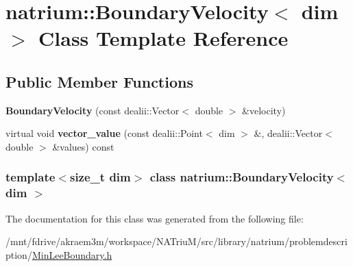 \hypertarget{classnatrium_1_1BoundaryVelocity}{
\section{natrium::BoundaryVelocity$<$ dim $>$ Class Template Reference}
\label{classnatrium_1_1BoundaryVelocity}
}
\subsection*{Public Member Functions}
\begin{DoxyCompactItemize}
\item 
\hypertarget{classnatrium_1_1BoundaryVelocity_af1152b7fba47fb5756cd286e849e3587}{
{\bfseries BoundaryVelocity} (const dealii::Vector$<$ double $>$ \&velocity)}
\label{classnatrium_1_1BoundaryVelocity_af1152b7fba47fb5756cd286e849e3587}

\item 
\hypertarget{classnatrium_1_1BoundaryVelocity_ab47b247a35c5f6a7fcee9765a47e2f97}{
virtual void {\bfseries vector\_\-value} (const dealii::Point$<$ dim $>$ \&, dealii::Vector$<$ double $>$ \&values) const }
\label{classnatrium_1_1BoundaryVelocity_ab47b247a35c5f6a7fcee9765a47e2f97}

\end{DoxyCompactItemize}
\subsubsection*{template$<$size\_\-t dim$>$ class natrium::BoundaryVelocity$<$ dim $>$}



The documentation for this class was generated from the following file:\begin{DoxyCompactItemize}
\item 
/mnt/fdrive/akraem3m/workspace/NATriuM/src/library/natrium/problemdescription/\hyperlink{MinLeeBoundary_8h}{MinLeeBoundary.h}\end{DoxyCompactItemize}
